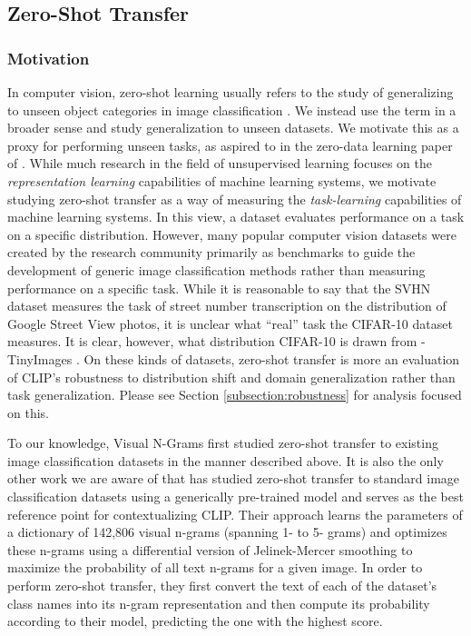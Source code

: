 \documentclass{article}
\begin{document}
\subsection{Zero-Shot Transfer}
\label{subsection:zero_shot_transfer}


\subsubsection{Motivation}

In computer vision, zero-shot learning usually refers to the study of generalizing to unseen object categories in image classification \citep{lampert2009learning}. We instead use the term in a broader sense and study generalization to unseen datasets. We motivate this as a proxy for performing unseen tasks, as aspired to in the zero-data learning paper of \citet{larochelle2008zero}. While much research in the field of unsupervised learning focuses on the \textit{representation learning} capabilities of machine learning systems, we motivate studying zero-shot transfer as a way of measuring the \textit{task-learning} capabilities of machine learning systems. In this view, a dataset evaluates performance on a task on a specific distribution. However, many popular computer vision datasets were created by the research community primarily as benchmarks to guide the development of generic image classification methods rather than measuring performance on a specific task. While it is reasonable to say that the SVHN dataset measures the task of street number transcription on the distribution of Google Street View photos, it is unclear what ``real'' task the CIFAR-10 dataset measures. It is clear, however, what distribution CIFAR-10 is drawn from - TinyImages \citep{torralba200880}. On these kinds of datasets, zero-shot transfer is more an evaluation of CLIP's robustness to distribution shift and domain generalization rather than task generalization. Please see Section \ref{subsection:robustness} for analysis focused on this.


To our knowledge, Visual N-Grams \citep{li2017learning} first studied zero-shot transfer to existing image classification datasets in the manner described above. It is also the only other work we are aware of that has studied zero-shot transfer to standard image classification datasets using a generically pre-trained model and serves as the best reference point for contextualizing CLIP. Their approach learns the parameters of a dictionary of 142,806 visual n-grams (spanning 1- to 5- grams) and optimizes these n-grams using a differential version of Jelinek-Mercer smoothing to maximize the probability of all text n-grams for a given image. In order to perform zero-shot transfer, they first convert the text of each of the dataset's class names into its n-gram representation and then compute its probability according to their model, predicting the one with the highest score.
\end{document}
